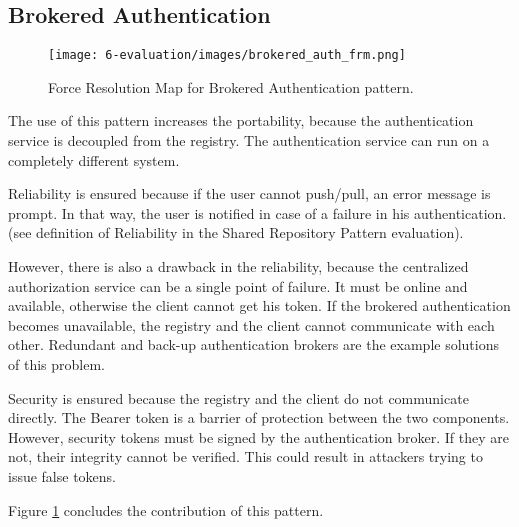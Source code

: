 \subsection{Brokered Authentication}

\begin{figure}[H]
\centering
\texttt{[image: 6-evaluation/images/brokered\_auth\_frm.png]}
\caption{Force Resolution Map for Brokered Authentication pattern.}
\label{fig:brokered-auth-frm}
\end{figure}

The use of this pattern increases the portability, because the authentication service is decoupled from the registry. The authentication service can run on a completely different system. 

Reliability is ensured because if the user cannot push/pull, an error message is
prompt. In that way, the user is notified in case of a failure in his
authentication. (see definition of Reliability in the Shared Repository Pattern
evaluation).

However, there is also a drawback in the reliability, because the centralized
authorization service can be a single point of failure. It must be online
and available, otherwise the client cannot get his token. If the brokered
authentication becomes unavailable, the registry and the client cannot
communicate with each other. Redundant and back-up authentication brokers are the
example solutions of this problem.

Security is ensured because the registry and the client do not communicate
directly. The Bearer token is a barrier of protection between the two
components. However, security tokens must be signed by the authentication broker.
If they are not, their integrity cannot be verified. This could result in
attackers trying to issue false tokens.

Figure \ref{fig:brokered-auth-frm} concludes the contribution of this pattern.
